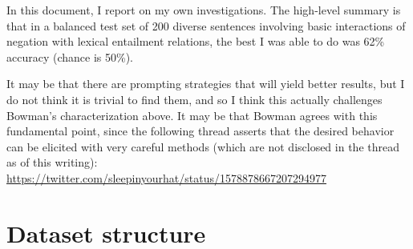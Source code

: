 \documentclass[11pt]{article}
\begin{document}
In this document, I report on my own investigations. The high-level
summary is that in a balanced test set of 200 diverse sentences
involving basic interactions of negation with lexical entailment
relations, the best I was able to do was 62\% accuracy (chance is
50\%).

It may be that there are prompting strategies that will yield better
results, but I do not think it is trivial to find them, and so I think
this actually challenges Bowman's characterization above. It may be
that Bowman agrees with this fundamental point, since the following
thread asserts that the desired behavior can be elicited with very
careful methods (which are not disclosed in the thread as of this
writing):
\\
\url{https://twitter.com/sleepinyourhat/status/1578878667207294977}


\newpage

\section{Dataset structure}
\end{document}

